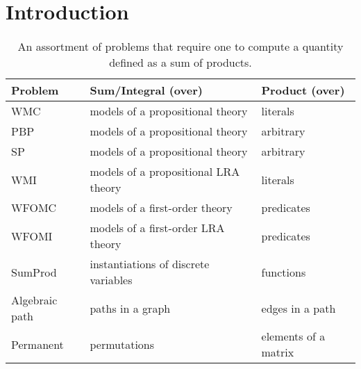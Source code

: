 


\chapter{Introduction} %



\begin{table}
  \caption{An assortment of problems that require one to compute a quantity defined as a sum of products.}
  \label{table:comparison}
  \centering
  \begin{tabular}{lll}
    \toprule
    Problem & Sum/Integral (over) & Product (over) \\
    \midrule
    WMC & models of a propositional theory & literals \\
    PBP & models of a propositional theory & arbitrary \\
    SP & models of a propositional theory & arbitrary \\
    WMI & models of a propositional LRA theory & literals \\
    WFOMC & models of a first-order theory & predicates \\
    WFOMI & models of a first-order LRA theory & predicates \\
    SumProd & instantiations of discrete variables & functions \\
    Algebraic path & paths in a graph & edges in a path \\
    Permanent & permutations & elements of a matrix \\
    \bottomrule
  \end{tabular}
\end{table}

